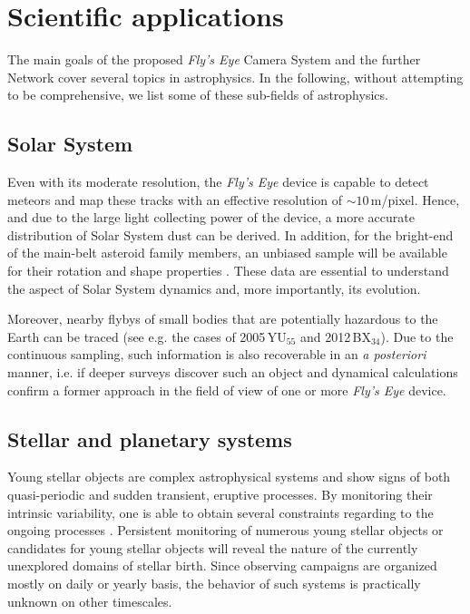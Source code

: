 \section{Scientific applications}

The main goals of the proposed {\it Fly's Eye} Camera System
and the further Network cover several topics in astrophysics. In the following, 
without attempting to be comprehensive, we list some of these sub-fields of
astrophysics. 

\subsection{Solar System} 
Even with its moderate resolution, 
the {\it Fly's Eye} device is capable to detect meteors and map 
these tracks with an effective resolution of $\sim10$\,m/pixel. Hence,
and due to the large light collecting power of the device, a more
accurate distribution of Solar System dust can be derived. In addition,
for the bright-end of the main-belt asteroid family members, an
unbiased sample will be available for their rotation and shape
properties \citep[see also][]{durech2011}.
These data are essential to understand the aspect
of Solar System dynamics and, more importantly, its evolution. 

Moreover,
nearby flybys of small bodies that are potentially hazardous to
the Earth can be traced (see e.g. the cases of 2005\,YU\ensuremath{_{55}} and 2012\,BX\ensuremath{_{34}}{}). 
Due to the continuous sampling, such information
is also recoverable in an \emph{a posteriori} manner, i.e. if deeper
surveys discover such an object and dynamical calculations confirm
a former approach in the field of view of one or more {\it Fly's Eye} device.

\subsection{Stellar and planetary systems} 
Young stellar objects are complex astrophysical systems and show 
signs of both quasi-periodic and sudden 
transient, eruptive processes. By monitoring their intrinsic variability,
one is able to obtain several constraints regarding to the ongoing processes
\citep{hartmann1996,abraham2009}. 
Persistent monitoring of numerous young stellar 
objects or candidates for young stellar objects will reveal the nature of the 
currently unexplored domains of stellar birth. Since observing campaigns
are organized mostly on daily or yearly basis, the behavior of
such systems is practically unknown on other timescales. 

